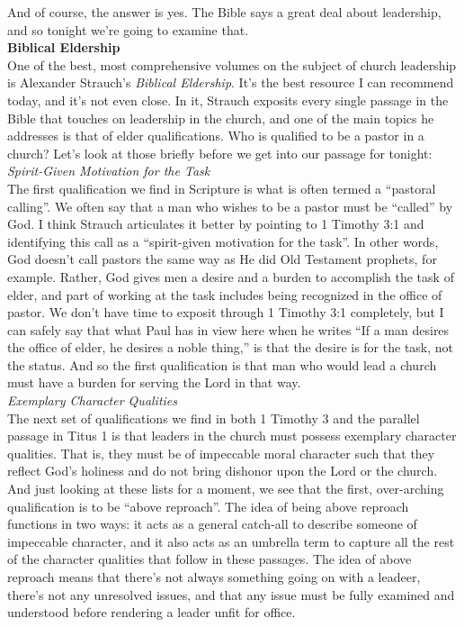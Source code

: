 \documentclass[letterpaper, 12pt]{article}
\begin{document}
    And of course, the answer is yes. The Bible says a great deal about
    leadership, and so tonight we're going to examine that. \\

    \noindent \textbf{Biblical Eldership} \\

    One of the best, most comprehensive volumes on the subject of church
    leadership is Alexander Strauch's \emph{Biblical Eldership}. It's
    the best resource I can recommend today, and it's not even close. In
    it, Strauch exposits every single passage in the Bible that touches
    on leadership in the church, and one of the main topics he addresses
    is that of elder qualifications. Who is qualified to be a pastor in
    a church? Let's look at those briefly before we get into our passage
    for tonight: \\

    \noindent \emph{Spirit-Given Motivation for the Task} \\

    The first qualification we find in Scripture is what is often termed
    a ``pastoral calling''. We often say that a man who wishes to be a
    pastor must be ``called'' by God. I think Strauch articulates it
    better by pointing to 1 Timothy 3:1 and identifying this call as a
    ``spirit-given motivation for the task''. In other words, God
    doesn't call pastors the same way as He did Old Testament prophets,
    for example. Rather, God gives men a desire and a burden to
    accomplish the task of elder, and part of working at the task
    includes being recognized in the office of pastor. We don't have
    time to exposit through 1 Timothy 3:1 completely, but I can safely
    say that what Paul has in view here when he writes ``If a man
    desires the office of elder, he desires a noble thing,'' is that the
    desire is for the task, not the status. And so the first
    qualification is that man who would lead a church must have a burden
    for serving the Lord in that way. \\

    \noindent \emph{Exemplary Character Qualities} \\

    The next set of qualifications we find in both 1 Timothy 3 and the
    parallel passage in Titus 1 is that leaders in the church must
    possess exemplary character qualities. That is, they must be of
    impeccable moral character such that they reflect God's holiness and
    do not bring dishonor upon the Lord or the church. And just looking
    at these lists for a moment, we see that the first, over-arching
    qualification is to be ``above reproach''. The idea of being above
    reproach functions in two ways: it acts as a general catch-all to
    describe someone of impeccable character, and it also acts as an
    umbrella term to capture all the rest of the character qualities
    that follow in these passages. The idea of above reproach means that
    there's not always something going on with a leadeer, there's not
    any unresolved issues, and that any issue must be fully examined and
    understood before rendering a leader unfit for office.
\end{document}
